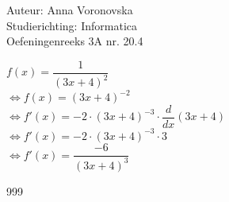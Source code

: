 \documentclass[a4paper]{article}
\begin{document}
  
\noindent \large Auteur: Anna Voronovska \\
\noindent \large Studierichting: Informatica\\
\noindent \large Oefeningenreeks 3A nr. 20.4\\

\medskip

\normalsize

$f(x) = \dfrac{1}{(3x+4)^2}$ \\

$\Leftrightarrow f(x) = (3x+4)^{-2}$ \\

$\Leftrightarrow f'(x) = -2 \cdot (3x+4)^{-3} \cdot \dfrac{d}{dx}(3x+4)$ \\

$\Leftrightarrow f'(x) = -2 \cdot (3x+4)^{-3} \cdot 3$ \\

$\Leftrightarrow f'(x) = \dfrac{-6}{(3x+4)^3}$



\begin{thebibliography}{999}
\end{thebibliography}
\end{document}

